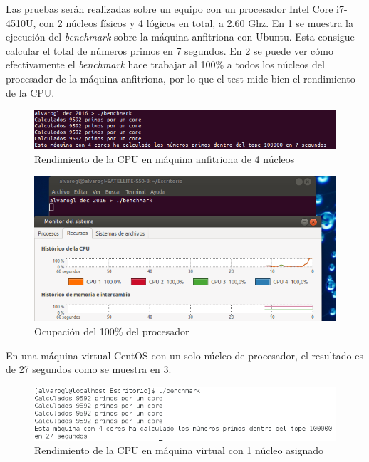 Las pruebas serán realizadas sobre un equipo con un procesador Intel Core i7-4510U, con 2 núcleos físicos y 4 lógicos en total, a 2.60 Ghz.
En \ref{cuestion5-02} se muestra la ejecución del \textit{benchmark} sobre la máquina anfitriona con Ubuntu. Esta consigue calcular el total de números primos en 7 segundos. En \ref{cuestion5-01} se puede ver cómo efectivamente el \textit{benchmark} hace trabajar al 100\% a todos los núcleos del procesador de la máquina anfitriona, por lo que el test mide bien el rendimiento de la CPU.

\begin{figure}[H]
	\centering
	\includegraphics[scale=0.6]{cuestion5-02.png}
	\caption{Rendimiento de la CPU en máquina anfitriona de 4 núcleos} \label{cuestion5-02}
\end{figure}

\begin{figure}[H]
	\centering
	\includegraphics[scale=0.35]{cuestion5-01.png}
	\caption{Ocupación del 100\% del procesador} \label{cuestion5-01}
\end{figure}

En una máquina virtual CentOS con un solo núcleo de procesador, el resultado es de 27 segundos como se muestra en \ref{cuestion5-03}.

\begin{figure}[H]
	\centering
	\includegraphics[scale=0.6]{cuestion5-03.png}
	\caption{Rendimiento de la CPU en máquina virtual con 1 núcleo asignado} \label{cuestion5-03}
\end{figure}

